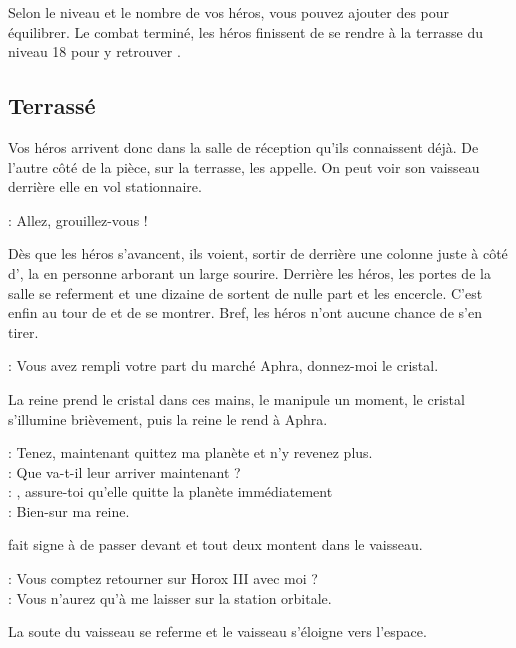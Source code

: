 Selon le niveau et le nombre de vos héros, vous pouvez ajouter des  pour équilibrer.
\bigbreak
Le combat terminé, les héros finissent de se rendre à la terrasse du niveau 18 pour y retrouver .
\newpage

\subsection{Terrassé}

Vos héros arrivent donc dans la salle de réception qu’ils connaissent déjà. De l’autre côté de la pièce, sur la terrasse,  les appelle. On peut voir son vaisseau derrière elle en vol stationnaire.

\begin{quotebox}
\noindent\textbf{}: Allez, grouillez-vous !
\end{quotebox}

Dès que les héros s’avancent, ils voient, sortir de derrière une colonne juste à côté d’, la  en personne arborant un large sourire. Derrière les héros, les portes de la salle se referment et une dizaine de  sortent de nulle part et les encercle. C’est enfin au tour de  et  de se montrer. Bref, les héros n’ont aucune chance de s’en tirer.

\begin{quotebox}
\noindent\textbf{}: Vous avez rempli votre part du marché Aphra, donnez-moi le cristal.
\end{quotebox}
La reine prend le cristal dans ces mains, le manipule un moment, le cristal s’illumine brièvement, puis la reine le rend à Aphra.
\begin{quotebox}
\noindent\textbf{}: Tenez, maintenant quittez ma planète et n’y revenez plus.\\
\noindent\textbf{}: Que va-t-il leur arriver maintenant ?\\
\noindent\textbf{}: , assure-toi qu’elle quitte la planète immédiatement\\
\noindent\textbf{}: Bien-sur ma reine.
\end{quotebox}
 fait signe à  de passer devant et tout deux montent dans le vaisseau.
\begin{quotebox}
\noindent\textbf{}: Vous comptez retourner sur Horox III avec moi ?\\
\noindent\textbf{}: Vous n’aurez qu’à me laisser sur la station orbitale.
\end{quotebox}
La soute du vaisseau se referme et le vaisseau s’éloigne vers l’espace.

